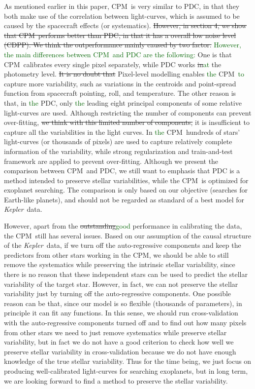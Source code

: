 \documentclass[12pt, preprint]{aastex}
\newcommand{\project}[1]{\textsl{#1}}
\newcommand{\Kepler}{\project{Kepler}}
\newcommand{\name}{CPM}
\newcommand{\revise}[1]{\textcolor{darkgreen}{#1}}
\newcommand{\remove}[1]{\sout{#1}}
\begin{document}
As mentioned earlier in this paper, 
  \name\ is very similar to PDC, 
  in that they both make use of the correlation between light-curves,
  which is assumed to be caused by the spacecraft effects (or systematics).
\remove{However, in section 4, we show that \name\ performs better than PDC, in that it has a overall low noise level (CDPP).
We think the outperformance mainly caused by two factor.}
\revise{However, the main differences between \name\ and PDC are the following:}
One is that \name\ calibrates every single pixel separately, 
  while PDC works \remove{in}\revise{at} the photometry level.
\remove{It is no doubt that} Pixel-level modelling enables \revise{the} \name\ \revise{to} capture more variability, such as 
variations in the centroids and point-spread function from spacecraft pointing, roll, and temperature.
The other reason is that, in \revise{the} PDC,  only \revise{the} leading eight principal components of some relative light-curves are used.
Although restricting the number of components can prevent over-fitting, \remove{we think with this limited number of components,} it is insufficient to capture all the variabilities in the light curves.
In \revise{the} \name\, hundreds of stars' light-curves (or thousands of pixels) are used to capture relatively complete information of the variability, while strong regularization and train-and-test framework are applied to prevent over-fitting.
Although we present the comparison between \name\ and PDC, 
  we still want to emphasis that PDC is a method intended to preserve stellar variabilities, 
  while the \name\ is optimized for exoplanet searching. 
The comparison is only based on our objective (searches for Earth-like planets), 
  and should not be regarded as standard of a best model for \Kepler\ data.
  
However, apart from the \remove{outstanding}\revise{good} performance in calibrating the data, the \name\ still has several issues. 
Based on our assumption of the causal structure of the \Kepler\ data, if we turn off the auto-regressive components and keep the predictors from other stars working in the \name, we should be able to still remove the systematics while preserving the intrinsic stellar variability, since there is no reason that these independent stars can be used to predict the stellar variability of the target star.
However, in fact, we can not preserve the stellar variability just by turning off the auto-regressive components. 
One possible reason can be that, since our model is so flexible (thousands of parameters), 
  in principle it can fit any functions. 
In this sense, 
  we should run cross-validation with the auto-regressive components turned off 
  and to find out how many pixels from other stars we need to just remove systematics 
  while preserve stellar variability, 
  but in fact we do not have a good criterion to check how well we preserve stellar variability in cross-validation 
  because we do not have enough knowledge of the true stellar variability. 
Thus for the time being, we just focus on producing well-calibrated light-curves for searching exoplanets, 
  but in long term, we are looking forward to find a method to preserve the stellar variability.
\end{document}

